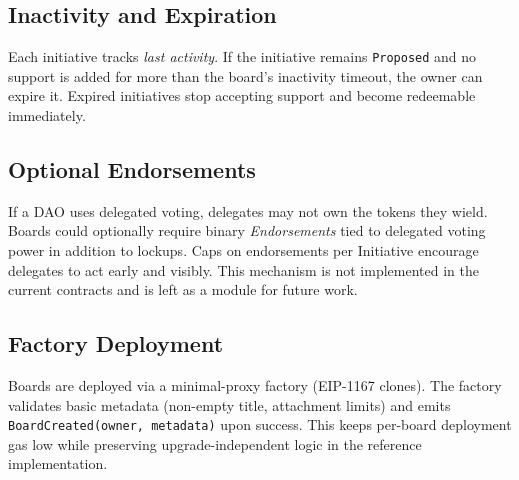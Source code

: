 \subsection{Inactivity and Expiration}
Each initiative tracks \emph{last activity}. If the initiative remains \texttt{Proposed} and no support is added for more than the board's inactivity timeout, the owner can expire it. Expired initiatives stop accepting support and become redeemable immediately.

\subsection{Optional Endorsements}
If a DAO uses delegated voting, delegates may not own the tokens they wield. Boards could optionally require binary \emph{Endorsements} tied to delegated voting power in addition to lockups. Caps on endorsements per Initiative encourage delegates to act early and visibly. This mechanism is not implemented in the current contracts and is left as a module for future work.

\subsection{Factory Deployment}
Boards are deployed via a minimal-proxy factory (EIP-1167 clones). The factory validates basic metadata (non-empty title, attachment limits) and emits \texttt{BoardCreated(owner, metadata)} upon success. This keeps per-board deployment gas low while preserving upgrade-independent logic in the reference implementation.
